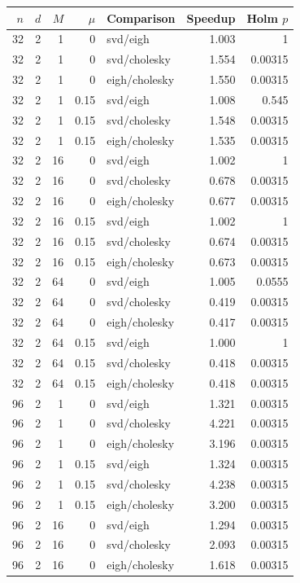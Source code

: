 \begin{tabular}{rrrrlrr}
\hline
$n$ & $d$ & $M$ & $\mu$ & Comparison & Speedup & Holm $p$ \\
\hline
32 & 2 & 1 & 0 & svd/eigh & 1.003 & 1 \\
32 & 2 & 1 & 0 & svd/cholesky & 1.554 & 0.00315 \\
32 & 2 & 1 & 0 & eigh/cholesky & 1.550 & 0.00315 \\
32 & 2 & 1 & 0.15 & svd/eigh & 1.008 & 0.545 \\
32 & 2 & 1 & 0.15 & svd/cholesky & 1.548 & 0.00315 \\
32 & 2 & 1 & 0.15 & eigh/cholesky & 1.535 & 0.00315 \\
32 & 2 & 16 & 0 & svd/eigh & 1.002 & 1 \\
32 & 2 & 16 & 0 & svd/cholesky & 0.678 & 0.00315 \\
32 & 2 & 16 & 0 & eigh/cholesky & 0.677 & 0.00315 \\
32 & 2 & 16 & 0.15 & svd/eigh & 1.002 & 1 \\
32 & 2 & 16 & 0.15 & svd/cholesky & 0.674 & 0.00315 \\
32 & 2 & 16 & 0.15 & eigh/cholesky & 0.673 & 0.00315 \\
32 & 2 & 64 & 0 & svd/eigh & 1.005 & 0.0555 \\
32 & 2 & 64 & 0 & svd/cholesky & 0.419 & 0.00315 \\
32 & 2 & 64 & 0 & eigh/cholesky & 0.417 & 0.00315 \\
32 & 2 & 64 & 0.15 & svd/eigh & 1.000 & 1 \\
32 & 2 & 64 & 0.15 & svd/cholesky & 0.418 & 0.00315 \\
32 & 2 & 64 & 0.15 & eigh/cholesky & 0.418 & 0.00315 \\
96 & 2 & 1 & 0 & svd/eigh & 1.321 & 0.00315 \\
96 & 2 & 1 & 0 & svd/cholesky & 4.221 & 0.00315 \\
96 & 2 & 1 & 0 & eigh/cholesky & 3.196 & 0.00315 \\
96 & 2 & 1 & 0.15 & svd/eigh & 1.324 & 0.00315 \\
96 & 2 & 1 & 0.15 & svd/cholesky & 4.238 & 0.00315 \\
96 & 2 & 1 & 0.15 & eigh/cholesky & 3.200 & 0.00315 \\
96 & 2 & 16 & 0 & svd/eigh & 1.294 & 0.00315 \\
96 & 2 & 16 & 0 & svd/cholesky & 2.093 & 0.00315 \\
96 & 2 & 16 & 0 & eigh/cholesky & 1.618 & 0.00315 \\

\end{tabular}
